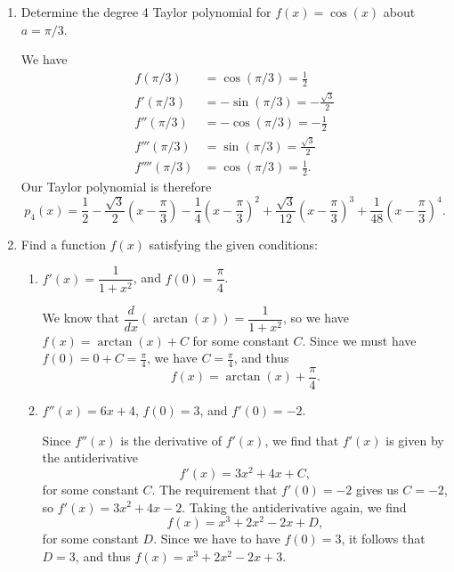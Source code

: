 \documentclass[12pt]{article}
\begin{document}
\begin{enumerate}
\begin{enumerate}
\end{enumerate}
\newpage
 \item Determine the degree 4 Taylor polynomial for $f(x)=\cos(x)$ about $a=\pi/3$.


 \bigskip

We have
\begin{align*}
 f(\pi/3) & = \cos(\pi/3) = \frac{1}{2}\\
 f'(\pi/3) & = -\sin(\pi/3) = -\frac{\sqrt{3}}{2}\\
 f''(\pi/3) & = -\cos(\pi/3) = -\frac{1}{2}\\
 f'''(\pi/3) & = \sin(\pi/3) = \frac{\sqrt{3}}{2}\\
 f''''(\pi/3) & = \cos(\pi/3) = \frac{1}{2}.
\end{align*}
Our Taylor polynomial is therefore
\[
 p_4(x) = \frac{1}{2}-\frac{\sqrt{3}}{2}\left(x-\frac{\pi}{3}\right)-\frac{1}{4}\left(x-\frac{\pi}{3}\right)^2+\frac{\sqrt{3}}{12}\left(x-\frac{\pi}{3}\right)^3+\frac{1}{48}\left(x-\frac{\pi}{3}\right)^4.
\]


\bigskip

 \item Find a function $f(x)$ satisfying the given conditions:
\begin{enumerate}
 \item $f'(x) = \dfrac{1}{1+x^2}$, and $f(0)=\dfrac{\pi}{4}$.

\bigskip

We know that $\dfrac{d}{dx}(\arctan(x)) = \dfrac{1}{1+x^2}$, so we have $f(x) = \arctan(x)+C$ for some constant $C$. Since we must have $f(0)=0+C=\frac{\pi}{4}$, we have $C=\frac{\pi}{4}$, and thus
\[
 f(x) = \arctan(x)+\frac{\pi}{4}.
\]

\medskip


 \item $f''(x) = 6x+4$, $f(0)=3$, and $f'(0) = -2$.

\bigskip

 Since $f''(x)$ is the derivative of $f'(x)$, we find that $f'(x)$ is given by the antiderivative
\[
 f'(x) = 3x^2+4x+C,
\]
for some constant $C$. The requirement that $f'(0)=-2$ gives us $C=-2$, so $f'(x) = 3x^2+4x-2$. Taking the antiderivative again, we find
\[
 f(x) = x^3+2x^2-2x+D,
\]
for some constant $D$. Since we have to have $f(0)=3$, it follows that $D=3$, and thus $f(x) = x^3+2x^2-2x+3$.

\end{enumerate}
\end{enumerate}
\end{document}
